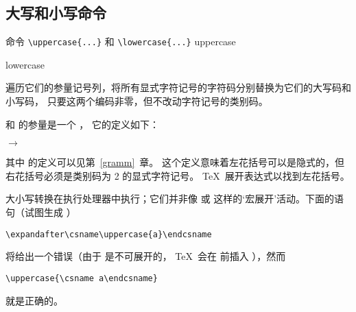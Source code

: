 \documentclass{book}
\begin{document}
\subsection{大写和小写命令}
\label{upcase}

命令 \verb-\uppercase{...}- 和 \verb-\lowercase{...}-
\cstoidx uppercase\par\cstoidx lowercase\par
遍历它们的参量记号列，将所有显式字符记号的字符码分别替换为它们的大写码和小写码，
只要这两个编码非零，但不改动字符记号的类别码。

 和  的参量是一个 ，
它的定义如下：
\begin{Disp}  $\longrightarrow$ \lb
      \end{Disp}
其中  的定义可以见第~\ref{gramm}~章。
这个定义意味着左花括号可以是隐式的，但右花括号必须是类别码为 2 的显式字符记号。
\TeX\ 展开表达式以找到左花括号。

大小写转换在执行处理器中执行；它们并非像 或 
这样的`宏展开'活动。下面的语句（试图生成 ）
\begin{verbatim}
\expandafter\csname\uppercase{a}\endcsname
\end{verbatim}
将给出一个错误（由于  是不可展开的，
\TeX\ 会在  前插入 ），然而
\begin{verbatim}
\uppercase{\csname a\endcsname}
\end{verbatim}
就是正确的。
\end{document}
